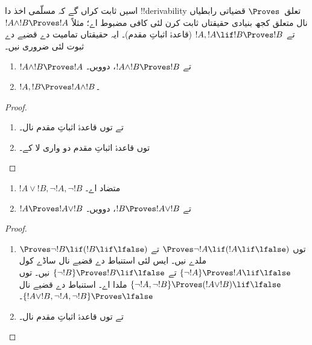 \documentclass[../../../include/open-logic-section]{subfiles}
\begin{document}
      {}
      {}


\begin{explain}
  اسیں ثابت کراں گے کہ مسلّمی اخذ دا !!{derivability} تعلق~$\Proves$
  قضیاتی رابطیاں نال متعلق کجھ بنیادی حقیقتاں ثابت کرن لئی کافی مضبوط اے؛
  مثلاً $!A \land !B
  \Proves !A$ تے $!A, !A \lif !B \Proves !B$ (قاعدۂ اثباتِ مقدم)۔
  ایہ حقیقتاں تمامیت دے قضیے دے ثبوت لئی ضروری نیں۔
\end{explain}

\begin{prop}
  \begin{enumerate}
  \item {} $!A \land !B \Proves
    !A$ تے $!A \land !B \Proves !B$، دوویں۔
  \item {} $!A, !B \Proves !A \land !B$۔
  \end{enumerate}
\end{prop}

\begin{proof}
  \begin{enumerate}
    \item {} تے  توں
      قاعدۂ اثباتِ مقدم نال۔
  \item {} توں قاعدۂ اثباتِ مقدم دو واری لا کے۔
  \end{enumerate}
\end{proof}


\begin{prop}
  \begin{enumerate}
  \item $!A \lor !B, \lnot !A, \lnot !B$ متضاد اے۔
  \item $!A \Proves !A \lor !B$ تے $!B \Proves !A \lor !B$، دوویں۔
  \end{enumerate}
\end{prop}

\begin{proof}
  \begin{enumerate}
  \item {} توں $\Proves \lnot !A \lif (!A
    \lif \lfalse)$ تے $\Proves \lnot !B \lif (!B \lif \lfalse)$
    ملدے نیں۔ ایس لئی استنباط دے قضیے نال ساڈے کول
    $\{\lnot !A\} \Proves !A \lif
    \lfalse$ تے $\{\lnot !B\} \Proves !B \lif \lfalse$ نیں۔
     توں $\{\lnot !A, \lnot !B\} \Proves (!A
    \lor !B) \lif \lfalse$ ملدا اے۔ استنباط دے قضیے نال
    $\{!A \lor !B, \lnot !A, \lnot !B\} \Proves \lfalse$۔
  \item {} تے  توں
    قاعدۂ اثباتِ مقدم نال۔
  \end{enumerate}
\end{proof}
\end{document}
